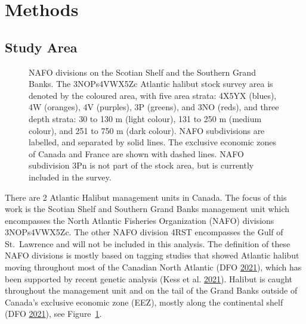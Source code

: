 \documentclass[12pt]{article}\usepackage[]{graphicx}\usepackage[]{color}
\begin{document}
\hypertarget{methods}{%
\section{Methods}\label{methods}}

\hypertarget{study-area}{%
\subsection{Study Area}\label{study-area}}
\begin{figure}[htb]

{\centering {} 

}

\caption{NAFO divisions on the Scotian Shelf and the Southern Grand Banks. The 3NOPs4VWX5Zc Atlantic halibut stock survey area is denoted by the coloured area, with five area strata: 4X5YX (blues), 4W (oranges), 4V (purples), 3P (greens), and 3NO (reds), and three depth strata: 30 to 130 m (light colour), 131 to 250 m (medium colour), and 251 to 750 m (dark colour). NAFO subdivisions are labelled, and separated by solid lines. The exclusive economic zones of Canada and France are shown with dashed lines. NAFO subdivision 3Pn is not part of the stock area, but is currently included in the survey.}\label{fig:nafo-strat}
\end{figure}
There are 2 Atlantic Halibut management units in Canada. The focus of this work is the Scotian Shelf and Southern Grand Banks management unit which encompasses the North Atlantic Fisheries Organization (NAFO) divisions 3NOPs4VWX5Zc. The other NAFO division 4RST encompasses the Gulf of St.~Lawrence and will not be included in this analysis. The definition of these NAFO divisions is mostly based on tagging studies that showed Atlantic halibut moving throughout most of the Canadian North Atlantic (DFO \protect\hyperlink{ref-DFO2021}{2021}), which has been supported by recent genetic analysis (Kess et al. \protect\hyperlink{ref-Kess2021}{2021}). Halibut is caught throughout the management unit and on the tail of the Grand Banks outside of Canada's exclusive economic zone (EEZ), mostly along the continental shelf (DFO \protect\hyperlink{ref-DFO2021}{2021}), see Figure~\ref{fig:nafo-strat}.
\end{document}
